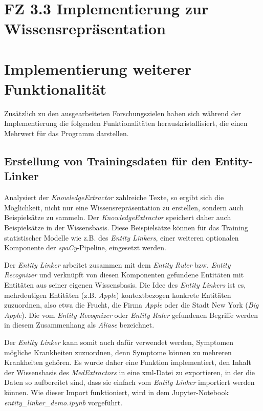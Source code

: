 \section{FZ 3.3 Implementierung zur Wissensrepräsentation}
\label{sec:FZ3.3} 

\section{Implementierung weiterer Funktionalität}

Zusätzlich zu den ausgearbeiteten Forschungszielen haben sich während der Implementierung die folgenden Funktionalitäten herauskristallisiert, die einen Mehrwert für das Programm darstellen.

\subsection{Erstellung von Trainingsdaten für den Entity-Linker}

Analysiert der \emph{KnowledgeExtractor} zahlreiche Texte, so ergibt sich die Möglichkeit, nicht nur eine Wissensrepräsentation zu erstellen, sondern auch Beispielsätze zu sammeln. Der \emph{KnowledgeExtractor} speichert daher auch Beispielsätze in der Wissensbasis. Diese Beispielsätze können für das Training statistischer Modelle wie z.B. des \emph{Entity Linkers}, einer weiteren optionalen Komponente der \emph{spaCy}-Pipeline, eingesetzt werden.

Der \emph{Entity Linker} arbeitet zusammen mit dem \emph{Entity Ruler} bzw. \emph{Entity Recognizer} und verknüpft von diesen Komponenten gefundene Entitäten mit Entitäten aus seiner eigenen Wissensbasis. Die Idee des \emph{Entity Linkers} ist es, mehrdeutigen Entitäten (z.B. \emph{Apple}) kontextbezogen konkrete Entitäten zuzuordnen, also etwa die Frucht, die Firma \emph{Apple} oder die Stadt New York (\emph{Big Apple}). Die vom \emph{Entity Recognizer} oder \emph{Entity Ruler} gefundenen Begriffe werden in diesem Zusammenhang als \emph{Aliase} bezeichnet.

Der \emph{Entity Linker} kann somit auch dafür verwendet werden, Symptomen mögliche Krankheiten zuzuordnen, denn Symptome können zu mehreren Krankheiten gehören. Es wurde daher eine Funktion implementiert, den Inhalt der Wissensbasis des \emph{MedExtractors} in eine xml-Datei zu exportieren, in der die Daten so aufbereitet sind, dass sie einfach vom \emph{Entity Linker} importiert werden können. Wie dieser Import funktioniert, wird in dem Jupyter-Notebook \emph{entity\_linker\_demo.ipynb} vorgeführt.

